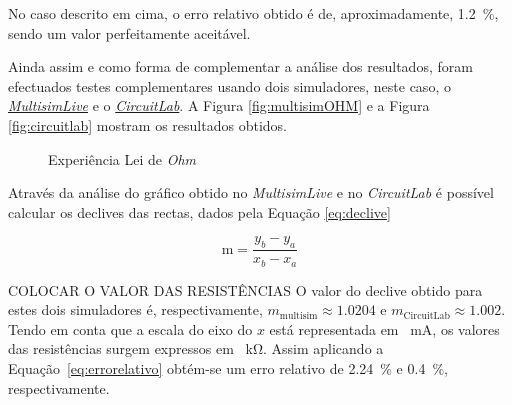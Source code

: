 No caso descrito em cima, o erro relativo obtido é de, aproximadamente, \SI{1.2}{\percent}, sendo um valor perfeitamente aceitável.

Ainda assim e como forma de complementar a análise dos resultados, foram efectuados testes complementares usando dois simuladores, neste caso, o \href{https://www.multisim.com}{\textit{MultisimLive}} e o \href{https://www.circuitlab.com/}{\textit{CircuitLab}}. A Figura \ref{fig:multisimOHM} e a Figura \ref{fig:circuitlab} mostram os resultados obtidos.

\begin{figure}[hbtp]
	\centering%
		\centering
		\qquad
		\caption{Experiência Lei de \textit{Ohm}}%
		\label{fig:experienciaOHM_simuladores}%
	\end{figure}

Através da análise do gráfico obtido no \textit{MultisimLive} e no \textit{CircuitLab} é possível calcular os declives das rectas, dados pela Equação \ref{eq:declive}

\begin{equation} \label{eq:declive}
	\text{m} = \frac{y_{b} - y_{a}}{x_{b} - x_{a}}
\end{equation}

COLOCAR O VALOR DAS RESISTÊNCIAS O valor do declive obtido para estes dois simuladores é, respectivamente, \linebreak $m_\text{{multisim}} \approx{1.0204}$ e $m_{\text{CircuitLab}} \approx{1.002}$. Tendo em conta que a escala do eixo do $x$ está representada em \SI{}{\milli\ampere}, os valores das resistências surgem expressos em \SI{}{\kilo\ohm}. Assim aplicando a Equação~\ref{eq:errorelativo} obtém-se um erro relativo de \SI{2.24}{\percent} e \SI{0.4}{\percent}, respectivamente.

